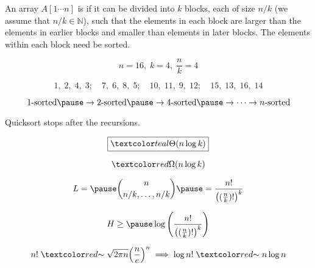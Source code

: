 
\begin{frame}{}
  \begin{definition}
    An array $A[1 \cdots n]$ is  if it can be divided into $k$ blocks, 
    each of size $n/k$ (we assume that $n/k \in \mathbb{N}$), 
    such that the elements in each block are larger than the elements 
    in earlier blocks and smaller than elements in later blocks. 
    The elements within each block need  be sorted.
  \end{definition}

  \[
    n = 16,\; k = 4,\; \frac{n}{k} = 4
  \]

  \[
    1,\;2,\;4,\;3;\quad 7,\;6,\;8,\;5;\quad 10,\;11,\;9,\;12;\quad 15,\;13,\;16,\;14
  \]
\end{frame}

\begin{frame}{}
  \centerline{}

  \pause
  \[
    1\text{-sorted} \pause \to 2\text{-sorted} \pause \to 4\text{-sorted} \pause \to \cdots \to n\text{-sorted}
  \]

  \pause
  \centerline{Quicksort  stops after the  recursions.}

  \pause
  \vspace{0.50cm}
  \[
    \boxed{\teal{\Theta(n \log k)}}
  \]
\end{frame}

\begin{frame}{}
  \[
    \red{\Omega(n \log k)}
  \]

  \pause
  \[
    L = \pause\binom{n}{n/k, \ldots, n/k} \pause = \frac{n!}{\left( (\frac{n}{k})! \right)^{k}}
  \]

  \pause
  \[
    H \ge \pause \log \left(\frac{n!}{\left( (\frac{n}{k})! \right)^{k}} \right)
  \]

  \pause
  \[
    n! \;\red{\sim}\; \sqrt{2 \pi n} \Big(\frac{n}{e}\Big)^{n} \implies \log n! \;\red{\sim}\; n \log n
  \]
\end{frame}

% 
% 
% 

